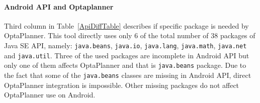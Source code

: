 \paragraph{Android API and Optaplanner}
Third column in Table~\ref{ApiDiffTable} describes if specific package is needed by OptaPlanner. This tool directly uses
only 6 of the total number of 38 packages of Java SE API, namely: \texttt{java.beans}, \texttt{java.io},
\texttt{java.lang}, \texttt{java.math}, \texttt{java.net} and \texttt{java.util}. Three of the used packages are
incomplete in Android API but only one of them affects OptaPlanner and that is \texttt{java.beans} package. Due to the
fact that some of the \texttt{java.beans} classes are missing in Android API, direct OptaPlanner integration is
impossible. Other missing packages do not affect OptaPlanner use on Android.

